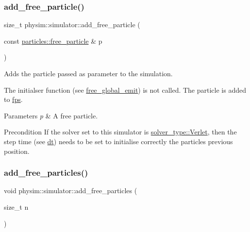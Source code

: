 \subsubsection{\texorpdfstring{add\+\_\+free\+\_\+particle()}{add\_free\_particle()}\hspace{0.1cm}{\footnotesize\ttfamily [2/2]}}
{\footnotesize\ttfamily size\+\_\+t physim\+::simulator\+::add\+\_\+free\+\_\+particle (\begin{DoxyParamCaption}\item[{const \hyperlink{classphysim_1_1particles_1_1free__particle}{particles\+::free\+\_\+particle} \&}]{p }\end{DoxyParamCaption})}



Adds the particle passed as parameter to the simulation. 

The initialser function (see \hyperlink{classphysim_1_1simulator_a05e2840fc39c644d7005ea938e63202f}{free\+\_\+global\+\_\+emit}) is not called. The particle is added to \hyperlink{classphysim_1_1simulator_a4f92b1da1d5e8e0c35d6339991b4d7ce}{fps}. 
\begin{DoxyParams}{Parameters}
{\em p} & A free particle. \\
\hline
\end{DoxyParams}
\begin{DoxyPrecond}{Precondition}
If the solver set to this simulator is \hyperlink{namespacephysim_a09adeda29c09e651877e880d31fc9686ac1f9df543f33d8a79fb2437c853f09b9}{solver\+\_\+type\+::\+Verlet}, then the step time (see \hyperlink{classphysim_1_1simulator_a12a60d0ed819937b51ce50162dbdd6e1}{dt}) needs to be set to initialise correctly the particle\textquotesingle{}s previous position. 
\end{DoxyPrecond}
\mbox{\label{classphysim_1_1simulator_a8729cd8c3590730d8897f61f2320f3e8}} 
\subsubsection{\texorpdfstring{add\+\_\+free\+\_\+particles()}{add\_free\_particles()}}
{\footnotesize\ttfamily void physim\+::simulator\+::add\+\_\+free\+\_\+particles (\begin{DoxyParamCaption}\item[{size\+\_\+t}]{n }\end{DoxyParamCaption})}



